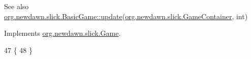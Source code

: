 \begin{DoxySeeAlso}{See also}
\mbox{\hyperlink{classorg_1_1newdawn_1_1slick_1_1_basic_game_acfe6fa05aef83bff1631af91a3e4bd20}{org.\+newdawn.\+slick.\+Basic\+Game\+::update}}(\mbox{\hyperlink{classorg_1_1newdawn_1_1slick_1_1_game_container}{org.\+newdawn.\+slick.\+Game\+Container}}, int) 
\end{DoxySeeAlso}


Implements \mbox{\hyperlink{interfaceorg_1_1newdawn_1_1slick_1_1_game_ab07b2e9463ee4631620dde0de25bdee8}{org.\+newdawn.\+slick.\+Game}}.


\begin{DoxyCode}
47                                   \{
48     \}
\end{DoxyCode}
